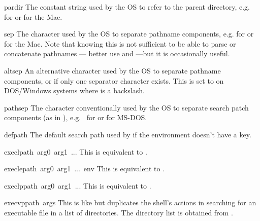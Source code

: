 \begin{datadesc}{pardir}
The constant string used by the OS to refer to the parent directory,
e.g.  for \POSIX{} or  for the Mac.
\end{datadesc}

\begin{datadesc}{sep}
The character used by the OS to separate pathname components,
e.g.  for \POSIX{} or  for the Mac.  Note that
knowing this is not sufficient to be able to parse or concatenate
pathnames --- better use  and
---but it is occasionally useful.
\end{datadesc}

\begin{datadesc}{altsep}
An alternative character used by the OS to separate pathname components,
or  if only one separator character exists.  This is set to
 on DOS/Windows systems where  is a backslash.
\end{datadesc}

\begin{datadesc}{pathsep}
The character conventionally used by the OS to separate search patch
components (as in ), e.g.\  for \POSIX{} or
 for MS-DOS.
\end{datadesc}

\begin{datadesc}{defpath}
The default search path used by  if the environment
doesn't have a  key.
\end{datadesc}

\begin{funcdesc}{execl}{path\, arg0\, arg1\, ...}
This is equivalent to
.
\end{funcdesc}

\begin{funcdesc}{execle}{path\, arg0\, arg1\, ...\, env}
This is equivalent to
.
\end{funcdesc}

\begin{funcdesc}{execlp}{path\, arg0\, arg1\, ...}
This is equivalent to
.
\end{funcdesc}

\begin{funcdesc}{execvp}{path\, args}
This is like  but duplicates
the shell's actions in searching for an executable file in a list of
directories.  The directory list is obtained from
.
\end{funcdesc}

